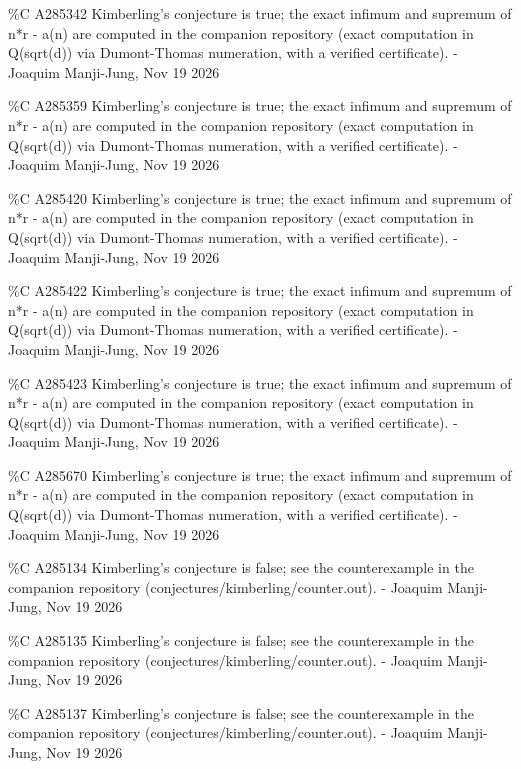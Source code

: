 {\%C A285342 Kimberling's conjecture is true; the exact infimum and supremum of n*r - a(n) are computed in the companion repository (exact computation in Q(sqrt(d)) via Dumont-Thomas numeration, with a verified certificate). - Joaquim Manji-Jung, Nov 19 2026\par
\%C A285359 Kimberling's conjecture is true; the exact infimum and supremum of n*r - a(n) are computed in the companion repository (exact computation in Q(sqrt(d)) via Dumont-Thomas numeration, with a verified certificate). - Joaquim Manji-Jung, Nov 19 2026\par
\%C A285420 Kimberling's conjecture is true; the exact infimum and supremum of n*r - a(n) are computed in the companion repository (exact computation in Q(sqrt(d)) via Dumont-Thomas numeration, with a verified certificate). - Joaquim Manji-Jung, Nov 19 2026\par
\%C A285422 Kimberling's conjecture is true; the exact infimum and supremum of n*r - a(n) are computed in the companion repository (exact computation in Q(sqrt(d)) via Dumont-Thomas numeration, with a verified certificate). - Joaquim Manji-Jung, Nov 19 2026\par
\%C A285423 Kimberling's conjecture is true; the exact infimum and supremum of n*r - a(n) are computed in the companion repository (exact computation in Q(sqrt(d)) via Dumont-Thomas numeration, with a verified certificate). - Joaquim Manji-Jung, Nov 19 2026\par
\%C A285670 Kimberling's conjecture is true; the exact infimum and supremum of n*r - a(n) are computed in the companion repository (exact computation in Q(sqrt(d)) via Dumont-Thomas numeration, with a verified certificate). - Joaquim Manji-Jung, Nov 19 2026\par
\%C A285134 Kimberling's conjecture is false; see the counterexample in the companion repository (conjectures/kimberling/counter.out). - Joaquim Manji-Jung, Nov 19 2026\par
\%C A285135 Kimberling's conjecture is false; see the counterexample in the companion repository (conjectures/kimberling/counter.out). - Joaquim Manji-Jung, Nov 19 2026\par
\%C A285137 Kimberling's conjecture is false; see the counterexample in the companion repository (conjectures/kimberling/counter.out). - Joaquim Manji-Jung, Nov 19 2026\par
}
